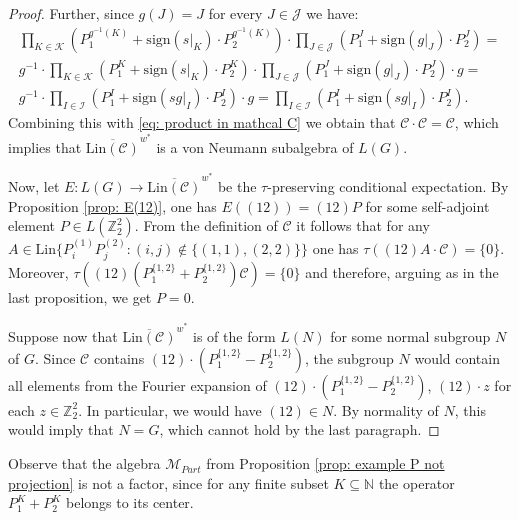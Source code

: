 \documentclass[11pt]{amsart}
\newcommand{\Z}{\mathbb Z}
\newcommand{\ie}{\text{i.e.\;}}
\newcommand{\sign}{\mathrm{sign}}
\newcommand{\Lin}{\mathrm{Lin}}
\theoremstyle{plain}
\theoremstyle{definition}
\theoremstyle{remark}
\numberwithin{equation}{section}
\begin{document}
\begin{proof}
 Further, since $g(J)=J$ for every $J\in\mathcal J$ we have:
 \begin{align*}\prod\limits_{K\in\mathcal K}(P_1^{g^{-1}(K)}+\sign(s|_K)\cdot P_2^{g^{-1}(K)})\cdot \prod\limits_{J\in\mathcal J}(P_1^J+\sign(g|_J)\cdot P_2^J)=\\g^{-1}\cdot\prod\limits_{K\in\mathcal K}(P_1^{K}+\sign(s|_K)\cdot P_2^{K})\cdot \prod\limits_{J\in\mathcal J}(P_1^J+\sign(g|_J)\cdot P_2^J)\cdot g=\\
 	g^{-1}\cdot\prod\limits_{I\in\mathcal I}(P_1^I+\sign(sg|_I)\cdot P_2^I)\cdot g=\prod\limits_{I\in\mathcal I}(P_1^I+\sign(sg|_I)\cdot P_2^I).\end{align*} Combining this with \eqref{eq: product in mathcal C} we obtain that $\mathcal C\cdot\mathcal C=\mathcal C$, which implies that $\overline{\Lin(\mathcal C)}^{w^*}$ is a von Neumann subalgebra of $L(G)$.
 

 	
 Now, let $E:L(G)\to \overline{\Lin(\mathcal C)}^{w^*}$ be the $\tau$-preserving conditional expectation. By Proposition \ref{prop: E(12)}, one has $E((12))=(12)P$ for some self-adjoint element $P\in L(\mathbb Z_2^2)$. %
From the definition of $\mathcal C$ it follows that for any $A\in \Lin\{P_i^{(1)}P_j^{(2)}:(i,j)\notin\{(1,1),(2,2)\}\}$ one has $\tau((12)A\cdot\mathcal C)=\{0\}$. Moreover, $\tau((12)(P_1^{\{1,2\}}+ P_2^{\{1,2\}})\mathcal C)=\{0\}$ and
therefore, arguing as in the last proposition,  we get $P=0$.

Suppose now that $\overline{\Lin(\mathcal C)}^{w^*}$ is of the form $L(N)$ for some normal subgroup $N$ of $G$. Since $\mathcal C$ contains $(12)\cdot (P_1^{\{1,2\}}-P_2^{\{1,2\}})$, the subgroup $N$ would contain all elements from the Fourier expansion of $(12)\cdot (P_1^{\{1,2\}}-P_2^{\{1,2\}})$, \ie $(12)\cdot z$ for each $z\in \Z_2^2$. In particular, we would have $(12)\in N$. By normality of $N$, this would imply that $N=G$, which cannot hold by the last paragraph.
 \end{proof}
 
 Observe that the algebra $\mathcal{M}_{Part}$ from Proposition \ref{prop: example P not projection} is not a factor, since for any finite subset $K\subseteq\mathbb N$ the operator $P_1^K+P_2^K$ belongs to its center. %
 
\end{document}
